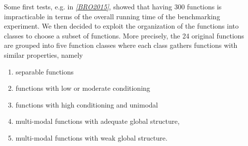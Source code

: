 \documentclass[letterpaper,12pt,english]{article}
\begin{document}
Some first tests, e.g. in \label{index:id6}{\hyperref[index:bro2015]{\emph{{[}BRO2015{]}}}}, showed that having 300 functions is
impracticable in terms of the overall running time of the benchmarking
experiment.  We then decided to exploit the organization of the 
functions into classes to choose a subset of functions. More precisely, the 24
original  functions are grouped into five function classes where each
class gathers functions with similar properties, namely
\begin{enumerate}
\item {} 
separable functions

\item {} 
functions with low or moderate conditioning

\item {} 
functions with high conditioning and unimodal

\item {} 
multi-modal functions with adequate global structure,

\item {} 
multi-modal functions with weak global structure.

\end{enumerate}
\end{document}
